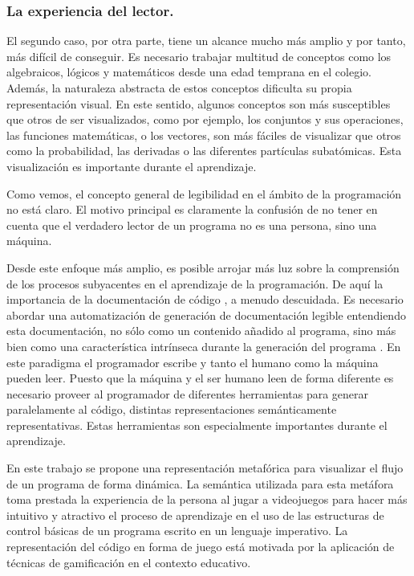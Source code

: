 \documentclass{llncs}
\begin{document}
\subsubsection{La experiencia del lector.}
\label{subsec:reader}

El segundo caso, por otra parte, tiene un alcance mucho más amplio y por tanto, más difícil de conseguir. Es necesario trabajar multitud de conceptos como los algebraicos, lógicos y matemáticos desde una edad temprana en el colegio. Además, la naturaleza abstracta de estos conceptos dificulta su propia representación visual. En este sentido, algunos conceptos son más susceptibles que otros de ser visualizados, como por ejemplo, los conjuntos y sus operaciones, las funciones matemáticas, o los vectores, son más fáciles de visualizar que otros como la probabilidad, las derivadas o las diferentes partículas subatómicas. Esta visualización es importante durante el aprendizaje.

Como vemos, el concepto general de legibilidad en el ámbito de la programación no está claro. El motivo principal es claramente la confusión de no tener en cuenta que el verdadero lector de un programa no es una persona, sino una máquina. 

Desde este enfoque más amplio, es posible arrojar más luz sobre la comprensión de los procesos subyacentes en el aprendizaje de la programación. De aquí la importancia de la documentación de código \cite{tenny1988program}, a menudo descuidada. Es necesario abordar una automatización de generación de documentación legible entendiendo esta documentación, no sólo como un contenido añadido al programa, sino más bien como una característica intrínseca durante la generación del programa \cite{baecker1988enhancing}. En este paradigma el programador escribe y tanto el humano como la máquina pueden leer. Puesto que la máquina y el ser humano leen de forma diferente es necesario proveer al programador de diferentes herramientas para generar paralelamente al código, distintas representaciones semánticamente representativas. Estas herramientas son especialmente importantes durante el aprendizaje.

En este trabajo se propone una representación metafórica para visualizar el flujo de un programa de forma dinámica. La semántica utilizada para esta metáfora toma prestada la experiencia de la persona al jugar a videojuegos para hacer más intuitivo y atractivo el proceso de aprendizaje en el uso de las estructuras de control básicas de un programa escrito en un lenguaje imperativo. La representación del código en forma de juego está motivada por la aplicación de técnicas de gamificación en el contexto educativo.
\end{document}
